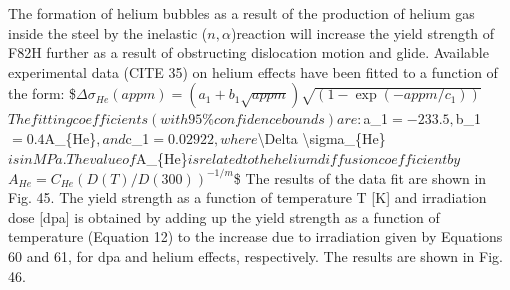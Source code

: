 \documentclass[letterpaper,10pt,english]{jupyterBook}
\begin{document}
	\sphinxAtStartPar
	The formation of helium bubbles as a result of the production of helium gas inside the steel by the inelastic (\(n,\alpha\))\sphinxhyphen{}reaction will increase the yield strength of F82H further as a result of obstructing dislocation motion and glide. Available experimental data (CITE 35) on helium effects have been fitted to a function of the form:
	\$\( \Delta \sigma_{He} (appm) = (a_1+b_1\sqrt{appm})\sqrt{(1-\exp(- appm/c_1))} \)\(
	The fitting coefficients (with 95\% confidence bounds) are: \)a\_1\( =-233.5, \)b\_1\( =0.4 \)A\_\{He\}\(, and \)c\_1\( = 0.02922, where \)\textbackslash{}Delta \textbackslash{}sigma\_\{He\}\( is in MPa. The value of \)A\_\{He\}\( is related to the helium diffusion coefficient by \)\(A_{He}=C_{He}(D(T)/D(300))^{-1/m}\)\$ The results of the data fit are shown in Fig. 45. The yield strength as a function of temperature T {[}K{]} and irradiation dose {[}dpa{]} is obtained by adding up the yield strength as a function of temperature (Equation 12) to the increase due to irradiation given by Equations 60 and 61, for dpa and helium effects, respectively. The results are shown in Fig. 46.
	
\end{document}
